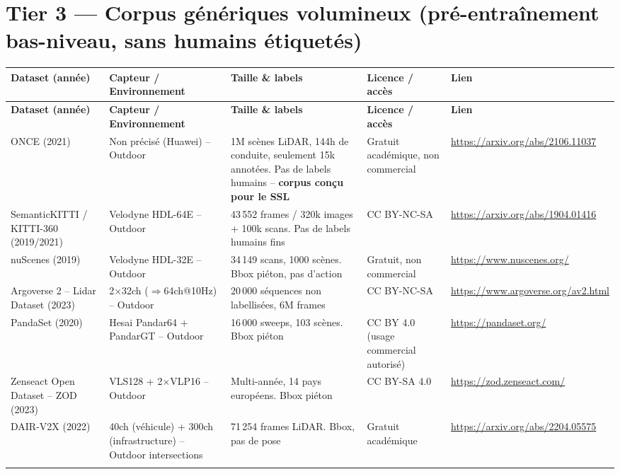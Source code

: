 \documentclass[11pt]{article}
\begin{document}
\section{Tier 3 --- Corpus génériques volumineux (pré-entraînement bas-niveau, sans humains étiquetés)}
\label{sec:tier3}

\begin{longtable}{P{2.6cm} P{3.0cm} P{4.2cm} P{2.4cm} P{3.0cm}}
\toprule
\textbf{Dataset (année)} & \textbf{Capteur / Environnement} & \textbf{Taille \& labels} & \textbf{Licence / accès} & \textbf{Lien} \\
\midrule
\endfirsthead
\toprule
\textbf{Dataset (année)} & \textbf{Capteur / Environnement} & \textbf{Taille \& labels} & \textbf{Licence / accès} & \textbf{Lien} \\
\midrule
\endhead

ONCE (2021) &
Non précisé (Huawei) -- Outdoor &
1M scènes LiDAR, 144h de conduite, seulement 15k annotées. Pas de labels humains -- \textbf{corpus conçu pour le SSL} &
Gratuit académique, non commercial &
\url{https://arxiv.org/abs/2106.11037} \\
\addlinespace

SemanticKITTI / KITTI-360 (2019/2021) &
Velodyne HDL-64E -- Outdoor &
43\,552 frames / 320k images + 100k scans. Pas de labels humains fins &
CC BY-NC-SA &
\url{https://arxiv.org/abs/1904.01416} \\
\addlinespace

nuScenes (2019) &
Velodyne HDL-32E -- Outdoor &
34\,149 scans, 1000 scènes. Bbox piéton, pas d'action &
Gratuit, non commercial &
\url{https://www.nuscenes.org/} \\
\addlinespace

Argoverse 2 -- Lidar Dataset (2023) &
2$\times$32ch ($\Rightarrow$64ch@10Hz) -- Outdoor &
20\,000 séquences non labellisées, 6M frames &
CC BY-NC-SA &
\url{https://www.argoverse.org/av2.html} \\
\addlinespace

PandaSet (2020) &
Hesai Pandar64 + PandarGT -- Outdoor &
16\,000 sweeps, 103 scènes. Bbox piéton &
CC BY 4.0 (usage commercial autorisé) &
\url{https://pandaset.org/} \\
\addlinespace

Zenseact Open Dataset -- ZOD (2023) &
VLS128 + 2$\times$VLP16 -- Outdoor &
Multi-année, 14 pays européens. Bbox piéton &
CC BY-SA 4.0 &
\url{https://zod.zenseact.com/} \\
\addlinespace

DAIR-V2X (2022) &
40ch (véhicule) + 300ch (infrastructure) -- Outdoor intersections &
71\,254 frames LiDAR. Bbox, pas de pose &
Gratuit académique &
\url{https://arxiv.org/abs/2204.05575} \\
\addlinespace


\end{longtable}
\end{document}
